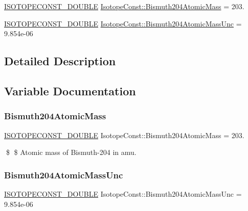 \begin{DoxyCompactItemize}
\item 
\mbox{\hyperlink{group___isotope_const-_macros_ga8f45a7272ce02c0b4c65c44636ed719a}{I\+S\+O\+T\+O\+P\+E\+C\+O\+N\+S\+T\+\_\+\+D\+O\+U\+B\+LE}} \mbox{\hyperlink{group___isotope_const-_bismuth-_bi204_ga19d5785193bdb682db223fda4ee7ed0f}{Isotope\+Const\+::\+Bismuth204\+Atomic\+Mass}} = 203.
\item 
\mbox{\hyperlink{group___isotope_const-_macros_ga8f45a7272ce02c0b4c65c44636ed719a}{I\+S\+O\+T\+O\+P\+E\+C\+O\+N\+S\+T\+\_\+\+D\+O\+U\+B\+LE}} \mbox{\hyperlink{group___isotope_const-_bismuth-_bi204_ga3ebb23856e3e3765cf76a31b0847e64b}{Isotope\+Const\+::\+Bismuth204\+Atomic\+Mass\+Unc}} = 9.\+854e-\/06
\end{DoxyCompactItemize}


\subsection{Detailed Description}


\subsection{Variable Documentation}
\mbox{\label{group___isotope_const-_bismuth-_bi204_ga19d5785193bdb682db223fda4ee7ed0f}} 
\subsubsection{\texorpdfstring{Bismuth204\+Atomic\+Mass}{Bismuth204AtomicMass}}
{\footnotesize\ttfamily \mbox{\hyperlink{group___isotope_const-_macros_ga8f45a7272ce02c0b4c65c44636ed719a}{I\+S\+O\+T\+O\+P\+E\+C\+O\+N\+S\+T\+\_\+\+D\+O\+U\+B\+LE}} Isotope\+Const\+::\+Bismuth204\+Atomic\+Mass = 203.}

\$ \$ Atomic mass of Bismuth-\/204 in amu. \mbox{\label{group___isotope_const-_bismuth-_bi204_ga3ebb23856e3e3765cf76a31b0847e64b}} 
\subsubsection{\texorpdfstring{Bismuth204\+Atomic\+Mass\+Unc}{Bismuth204AtomicMassUnc}}
{\footnotesize\ttfamily \mbox{\hyperlink{group___isotope_const-_macros_ga8f45a7272ce02c0b4c65c44636ed719a}{I\+S\+O\+T\+O\+P\+E\+C\+O\+N\+S\+T\+\_\+\+D\+O\+U\+B\+LE}} Isotope\+Const\+::\+Bismuth204\+Atomic\+Mass\+Unc = 9.\+854e-\/06}

